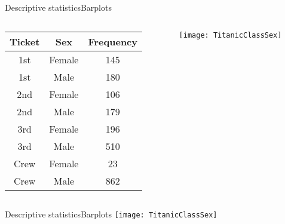 \documentclass[xcolor=dvipsnames]{beamer}
\begin{document}
\begin{frame}{Descriptive statistics}{Barplots}
\begin{columns}
	\begin{column}{0.43 \textwidth}
		\begin{tabular}{|c|c|c|}
			\hline
			\textbf{Ticket} & \textbf{Sex} & \textbf{Frequency} \\
			\hline \hline
			1st & Female & 145\\
			\hline
			1st &  Male & 180\\
			\hline
			2nd & Female & 106\\
			\hline
			2nd  & Male & 179\\
			\hline
			3rd & Female & 196\\
			\hline
			3rd  & Male & 510\\
			\hline
			Crew & Female &  23\\
			\hline
			Crew  & Male & 862\\
			\hline
		\end{tabular}
	\end{column}
	\begin{column}{0.57 \textwidth}
		\texttt{[image: TitanicClassSex]}
	\end{column}
\end{columns}
\end{frame}

\begin{frame}{Descriptive statistics}{Barplots}
\texttt{[image: TitanicClassSex]}
\end{frame}
\end{document}
